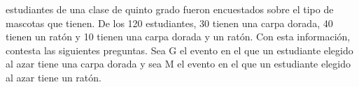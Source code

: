  estudiantes de una clase de quinto grado fueron encuestados sobre el tipo de mascotas que tienen. 
De los 120 estudiantes, 30 tienen una carpa dorada, 40 tienen un ratón y 10 tienen una carpa dorada y un ratón. 
Con esta información, contesta las siguientes preguntas.
Sea G el evento en el que un estudiante elegido al azar tiene una carpa dorada y sea M el evento en el que un 
estudiante elegido al azar tiene un ratón.
